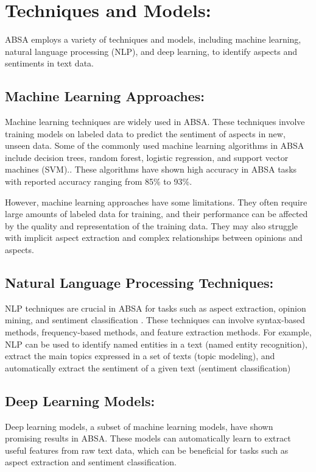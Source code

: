 \documentclass{article}
\begin{document}
\section{Techniques and Models: }
ABSA employs a variety of techniques and models, including machine learning, natural language processing (NLP), and deep learning, to identify aspects and sentiments in text data. \cite{NazirIssues&Chall2023}

\subsection{Machine Learning Approaches: }
Machine learning techniques are widely used in ABSA. These techniques involve training models on labeled data to predict the sentiment of aspects in new, unseen data. Some of the commonly used machine learning algorithms in ABSA include decision trees, random forest, logistic regression, and support vector machines (SVM).\cite{Adagale2023AspectBS}\cite{Horsa2023AspectBasedSA}. These algorithms have shown high accuracy in ABSA tasks with reported accuracy ranging from 85\% to 93\%.\cite{Horsa2023AspectBasedSA}\cite{hua2023systematic}

However, machine learning approaches have some limitations. They often require large amounts of labeled data for training, and their performance can be affected by the quality and representation of the training data. They may also struggle with implicit aspect extraction and complex relationships between opinions and aspects\cite{Adagale2023AspectBS}.

\subsection{Natural Language Processing Techniques:}
NLP techniques are crucial in ABSA for tasks such as aspect extraction, opinion mining, and sentiment classification \cite{rocca2023natural}\cite{Adagale2023AspectBS}. These techniques can involve syntax-based methods, frequency-based methods, and feature extraction methods\cite{Adagale2023AspectBS}. For example, NLP can be used to identify named entities in a text (named entity recognition), extract the main topics expressed in a set of texts (topic modeling), and automatically extract the sentiment of a given text (sentiment classification) \cite{rocca2023natural}

\subsection{Deep Learning Models: }
Deep learning models, a subset of machine learning models, have shown promising results in ABSA. These models can automatically learn to extract useful features from raw text data, which can be beneficial for tasks such as aspect extraction and sentiment classification.\cite{Kumar2023AspectBasedSA} \cite{Dhanith2023ACE}
\end{document}
